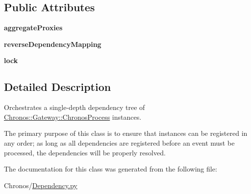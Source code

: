 \subsection*{Public Attributes}
\begin{DoxyCompactItemize}
\item 
{\bfseries aggregate\+Proxies}
\item 
{\bfseries reverse\+Dependency\+Mapping}
\item 
{\bfseries lock}
\end{DoxyCompactItemize}


\subsection{Detailed Description}
Orchestrates a single-\/depth dependency tree of \hyperlink{classChronos_1_1Gateway_1_1ChronosProcess}{Chronos\+::\+Gateway\+::\+Chronos\+Process} instances. 

The primary purpose of this class is to ensure that instances can be registered in any order; as long as all dependencies are registered before an event must be processed, the dependencies will be properly resolved. 

The documentation for this class was generated from the following file\+:\begin{DoxyCompactItemize}
\item 
Chronos/\hyperlink{Dependency_8py}{Dependency.\+py}\end{DoxyCompactItemize}
